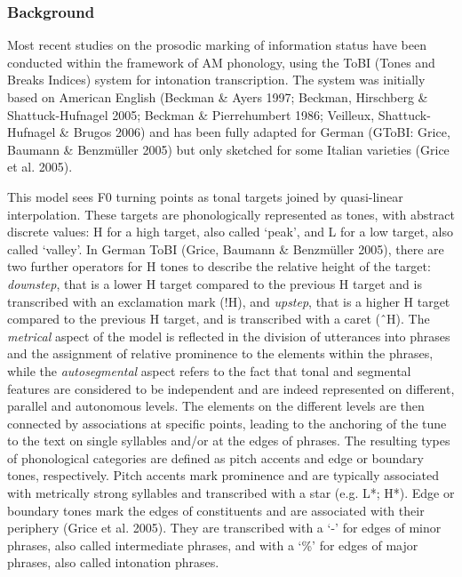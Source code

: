 \subsubsection[Background]{Background}
\hypertarget{Toc191305917}{}\begin{styleStandard}
Most recent studies on the prosodic marking of information status have been conducted within the framework of AM phonology, using the ToBI (Tones and Breaks Indices) system for intonation transcription. The system was initially based on American English (Beckman \& Ayers 1997; Beckman, Hirschberg \& Shattuck-Hufnagel 2005; Beckman \& Pierrehumbert 1986; Veilleux, Shattuck-Hufnagel \& Brugos 2006) and has been fully adapted for German (GToBI: Grice, Baumann \& Benzmüller 2005) but only sketched for some Italian varieties (Grice et al. 2005).
\end{styleStandard}

\begin{styleStandard}
This model sees F0 turning points as tonal targets joined by quasi-linear interpolation. These targets are phonologically represented as tones, with abstract discrete values: H for a high target, also called ‘peak’, and L for a low target, also called ‘valley’. In German ToBI (Grice, Baumann \& Benzmüller 2005), there are two further operators for H tones to describe the relative height of the target: \textit{downstep}, that is a lower H target compared to the previous H target and is transcribed with an exclamation mark (!H), and \textit{upstep}, that is a higher H target compared to the previous H target, and is transcribed with a caret (ˆH). The \textit{metrical} aspect of the model is reflected in the division of utterances into phrases and the assignment of relative prominence to the elements within the phrases, while the \textit{autosegmental} aspect refers to the fact that tonal and segmental features are considered to be independent and are indeed represented on different, parallel and autonomous levels. The elements on the different levels are then connected by associations at specific points, leading to the anchoring of the tune to the text on single syllables and/or at the edges of phrases. The resulting types of phonological categories are defined as pitch accents and edge or boundary tones, respectively. Pitch accents mark prominence and are typically associated with metrically strong syllables and transcribed with a star (e.g. L*; H*). Edge or boundary tones mark the edges of constituents and are associated with their periphery (Grice et al. 2005). They are transcribed with a ‘-’ for edges of minor phrases, also called intermediate phrases, and with a ‘\%’ for edges of major phrases, also called intonation phrases.
\end{styleStandard}

